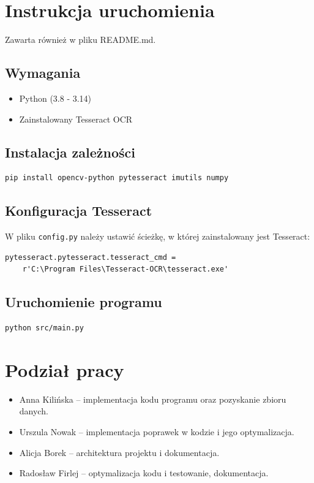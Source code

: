 \documentclass[12pt,a4paper]{article}
\begin{document}
\section{Instrukcja uruchomienia}
Zawarta również w pliku README.md.

\subsection{Wymagania}
\begin{itemize}
    \item Python (3.8 - 3.14)
    \item Zainstalowany Tesseract OCR
\end{itemize}

\subsection{Instalacja zależności}

\begin{verbatim}
pip install opencv-python pytesseract imutils numpy
\end{verbatim}

\subsection{Konfiguracja Tesseract}

W pliku \texttt{config.py} należy ustawić ścieżkę, w której zainstalowany jest Tesseract:

\begin{verbatim}
pytesseract.pytesseract.tesseract_cmd =
    r'C:\Program Files\Tesseract-OCR\tesseract.exe'
\end{verbatim}

\subsection{Uruchomienie programu}

\begin{verbatim}
python src/main.py
\end{verbatim}

\section{Podział pracy}

\begin{itemize}
    \item Anna Kilińska -- implementacja kodu programu oraz pozyskanie zbioru danych.
    \item Urszula Nowak -- implementacja poprawek w kodzie i jego optymalizacja.
    \item Alicja Borek -- architektura projektu i dokumentacja.
    \item Radosław Firlej -- optymalizacja kodu i testowanie, dokumentacja.
\end{itemize}
\end{document}
